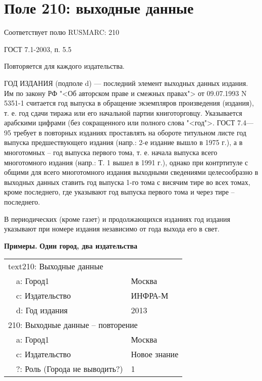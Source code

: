 \chapter{Поле 210: выходные данные}

Соответствует полю RUSMARC: 210

ГОСТ 7.1-2003, п. 5.5 %

Повторяется для каждого издательства.

ГОД ИЗДАНИЯ (подполе d) — последний элемент выходных данных издания. Им по закону РФ "<Об авторском праве и смежных правах"> от 09.07.1993 N 5351-1 считается год выпуска в обращение экземпляров произведения (издания), т. е. год сдачи тиража или его начальной партии книготорговцу. Указывается арабскими цифрами (без сокращенного или полного слова "<год">. ГОСТ 7.4—95 требует в повторных изданиях проставлять на обороте титульном листе год выпуска предшествующего издания (напр.: 2-е издание вышло в 1975 г.), а в многотомных -- год выпуска первого тома, т. е. начала выпуска всего многотомного издания (напр.: Т. 1 вышел в 1991 г.), однако при контртитуле с общими для всего многотомного издания выходными сведениями целесообразно в выходных данных ставить год выпуска 1-го тома с висячим тире во всех томах, кроме последнего, где указывают год выпуска первого тома и через тире -- последнего.

В периодических (кроме газет) и продолжающихся изданиях год издания указывают при номере издания независимо от года выхода его в свет.

\textbf{Примеры.} \textbf{Один город, два издательства}

\begin{tabular}{| l | l | l |}
	\hline
	\thead{Поле} & \thead{Подполе} & \thead{Значение} \\
	\hline
	\multicolumn{3}{|l|}{text210: Выходные данные} \\
	\hline
	& a: Город1 & Москва \\
	\hline
	& c: Издательство & ИНФРА-М \\
	\hline
	& d: Год издания & 2013 \\
	\hline
	\multicolumn{3}{|l|}{210: Выходные данные -- повторение} \\
	\hline
	& a: Город1 & Москва \\
	\hline
	& c: Издательство & Новое знание \\
	\hline
	& ?: Роль (Города не выводить?) & 1 \\
	\hline
\end{tabular}

